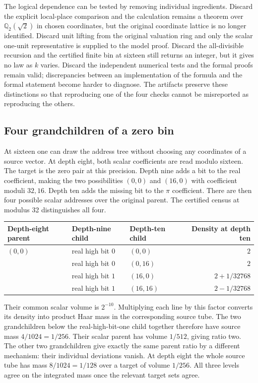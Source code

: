 \documentclass[12pt,letterpaper]{article}
\begin{document}
The logical dependence can be tested by removing individual ingredients. Discard the explicit local-place comparison and the calculation remains a theorem over $\mathbb Q_2(\sqrt2)$ in chosen coordinates, but the original coordinate lattice is no longer identified. Discard unit lifting from the original valuation ring and only the scalar one-unit representative is supplied to the model proof. Discard the all-divisible recursion and the certified finite bin at sixteen still returns an integer, but it gives no law as $k$ varies. Discard the independent numerical tests and the formal proofs remain valid; discrepancies between an implementation of the formula and the formal statement become harder to diagnose. The artifacts preserve these distinctions so that reproducing one of the four checks cannot be misreported as reproducing the others.
\subsection{Four grandchildren of a zero bin}
At sixteen one can draw the address tree without choosing any coordinates of a source vector. At depth eight, both scalar coefficients are read modulo sixteen. The target is the zero pair at this precision. Depth nine adds a bit to the real coefficient, making the two possibilities $(0,0)$ and $(16,0)$ with coefficient moduli $32,16$. Depth ten adds the missing bit to the $\pi$ coefficient. There are then four possible scalar addresses over the original parent. The certified census at modulus 32 distinguishes all four.

\begin{center}\small
\begin{tabular}{@{}lllr@{}}\toprule
Depth-eight parent&Depth-nine child&Depth-ten child&Density at depth ten\\\midrule
$(0,0)$&real high bit $0$&$(0,0)$&$2$\\
&real high bit $0$&$(0,16)$&$2$\\[2pt]
&real high bit $1$&$(16,0)$&$2+1/32768$\\
&real high bit $1$&$(16,16)$&$2-1/32768$\\\bottomrule
\end{tabular}
\end{center}
Their common scalar volume is $2^{-10}$. Multiplying each line by this factor converts its density into product Haar mass in the corresponding source tube. The two grandchildren below the real-high-bit-one child together therefore have source mass $4/1024=1/256$. Their scalar parent has volume $1/512$, giving ratio two. The other two grandchildren give exactly the same parent ratio by a different mechanism: their individual deviations vanish. At depth eight the whole source tube has mass $8/1024=1/128$ over a target of volume $1/256$. All three levels agree on the integrated mass once the relevant target sets agree.
\end{document}
